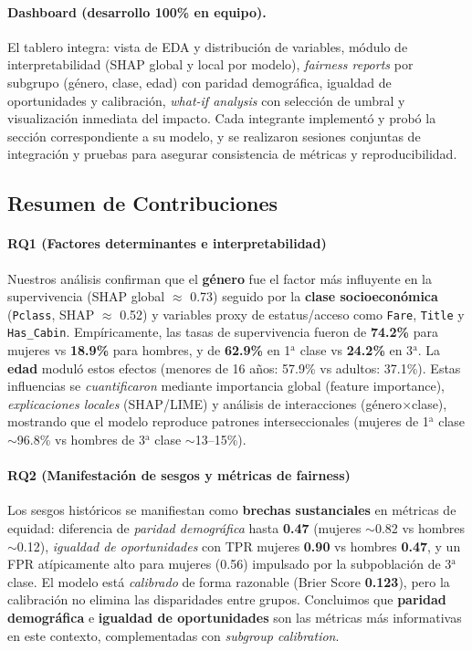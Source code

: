 \documentclass[conference]{IEEEtran}
\begin{document}
\paragraph*{Dashboard (desarrollo 100\% en equipo).}
El tablero integra: vista de EDA y distribución de variables, módulo de interpretabilidad (SHAP global y local por modelo),  \emph{fairness reports} por subgrupo (género, clase, edad) con paridad demográfica, igualdad de oportunidades y calibración, \emph{what-if analysis} con selección de umbral y visualización inmediata del impacto. Cada integrante implementó y probó la sección correspondiente a su modelo, y se realizaron sesiones conjuntas de integración y pruebas para asegurar consistencia de métricas y reproducibilidad.


\subsection{Resumen de Contribuciones}

\paragraph{RQ1 (Factores determinantes e interpretabilidad)}
Nuestros análisis confirman que el \textbf{género} fue el factor más influyente en la supervivencia (SHAP global $\approx$ 0.73) seguido por la \textbf{clase socioeconómica} (\texttt{Pclass}, SHAP $\approx$ 0.52) y variables proxy de estatus/acceso como \texttt{Fare}, \texttt{Title} y \texttt{Has\_Cabin}. Empíricamente, las tasas de supervivencia fueron de \textbf{74.2\%} para mujeres vs \textbf{18.9\%} para hombres, y de \textbf{62.9\%} en 1$^{\mathrm{a}}$ clase vs \textbf{24.2\%} en 3$^{\mathrm{a}}$. La \textbf{edad} moduló estos efectos (menores de 16 años: 57.9\% vs adultos: 37.1\%). Estas influencias se \emph{cuantificaron} mediante importancia global (feature importance), \emph{explicaciones locales} (SHAP/LIME) y análisis de interacciones (género$\times$clase), mostrando que el modelo reproduce patrones interseccionales (mujeres de 1$^{\mathrm{a}}$ clase $\sim$96.8\% vs hombres de 3$^{\mathrm{a}}$ clase $\sim$13--15\%).

\paragraph{RQ2 (Manifestación de sesgos y métricas de fairness)}
Los sesgos históricos se manifiestan como \textbf{brechas sustanciales} en métricas de equidad: diferencia de \emph{paridad demográfica} hasta \textbf{0.47} (mujeres $\sim$0.82 vs hombres $\sim$0.12), \emph{igualdad de oportunidades} con TPR mujeres \textbf{0.90} vs hombres \textbf{0.47}, y un FPR atípicamente alto para mujeres (0.56) impulsado por la subpoblación de 3$^{\mathrm{a}}$ clase. El modelo está \emph{calibrado} de forma razonable (Brier Score \textbf{0.123}), pero la calibración no elimina las disparidades entre grupos. Concluimos que \textbf{paridad demográfica} e \textbf{igualdad de oportunidades} son las métricas más informativas en este contexto, complementadas con \emph{subgroup calibration}.
\end{document}
